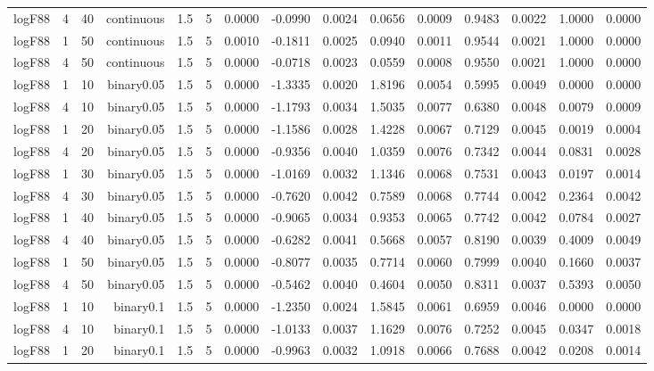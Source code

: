 \begin{longtable}{rrrrrrrrrrrrrrr}
  logF88 & 4 & 40 & continuous & 1.5 & 5 & 0.0000 & -0.0990 & 0.0024 & 0.0656 & 0.0009 & 0.9483 & 0.0022 & 1.0000 & 0.0000 \\ 
  logF88 & 1 & 50 & continuous & 1.5 & 5 & 0.0010 & -0.1811 & 0.0025 & 0.0940 & 0.0011 & 0.9544 & 0.0021 & 1.0000 & 0.0000 \\ 
  logF88 & 4 & 50 & continuous & 1.5 & 5 & 0.0000 & -0.0718 & 0.0023 & 0.0559 & 0.0008 & 0.9550 & 0.0021 & 1.0000 & 0.0000 \\ 
  logF88 & 1 & 10 & binary0.05 & 1.5 & 5 & 0.0000 & -1.3335 & 0.0020 & 1.8196 & 0.0054 & 0.5995 & 0.0049 & 0.0000 & 0.0000 \\ 
  logF88 & 4 & 10 & binary0.05 & 1.5 & 5 & 0.0000 & -1.1793 & 0.0034 & 1.5035 & 0.0077 & 0.6380 & 0.0048 & 0.0079 & 0.0009 \\ 
  logF88 & 1 & 20 & binary0.05 & 1.5 & 5 & 0.0000 & -1.1586 & 0.0028 & 1.4228 & 0.0067 & 0.7129 & 0.0045 & 0.0019 & 0.0004 \\ 
  logF88 & 4 & 20 & binary0.05 & 1.5 & 5 & 0.0000 & -0.9356 & 0.0040 & 1.0359 & 0.0076 & 0.7342 & 0.0044 & 0.0831 & 0.0028 \\ 
  logF88 & 1 & 30 & binary0.05 & 1.5 & 5 & 0.0000 & -1.0169 & 0.0032 & 1.1346 & 0.0068 & 0.7531 & 0.0043 & 0.0197 & 0.0014 \\ 
  logF88 & 4 & 30 & binary0.05 & 1.5 & 5 & 0.0000 & -0.7620 & 0.0042 & 0.7589 & 0.0068 & 0.7744 & 0.0042 & 0.2364 & 0.0042 \\ 
  logF88 & 1 & 40 & binary0.05 & 1.5 & 5 & 0.0000 & -0.9065 & 0.0034 & 0.9353 & 0.0065 & 0.7742 & 0.0042 & 0.0784 & 0.0027 \\ 
  logF88 & 4 & 40 & binary0.05 & 1.5 & 5 & 0.0000 & -0.6282 & 0.0041 & 0.5668 & 0.0057 & 0.8190 & 0.0039 & 0.4009 & 0.0049 \\ 
  logF88 & 1 & 50 & binary0.05 & 1.5 & 5 & 0.0000 & -0.8077 & 0.0035 & 0.7714 & 0.0060 & 0.7999 & 0.0040 & 0.1660 & 0.0037 \\ 
  logF88 & 4 & 50 & binary0.05 & 1.5 & 5 & 0.0000 & -0.5462 & 0.0040 & 0.4604 & 0.0050 & 0.8311 & 0.0037 & 0.5393 & 0.0050 \\ 
  logF88 & 1 & 10 & binary0.1 & 1.5 & 5 & 0.0000 & -1.2350 & 0.0024 & 1.5845 & 0.0061 & 0.6959 & 0.0046 & 0.0000 & 0.0000 \\ 
  logF88 & 4 & 10 & binary0.1 & 1.5 & 5 & 0.0000 & -1.0133 & 0.0037 & 1.1629 & 0.0076 & 0.7252 & 0.0045 & 0.0347 & 0.0018 \\ 
  logF88 & 1 & 20 & binary0.1 & 1.5 & 5 & 0.0000 & -0.9963 & 0.0032 & 1.0918 & 0.0066 & 0.7688 & 0.0042 & 0.0208 & 0.0014 \\ 

\end{longtable}
